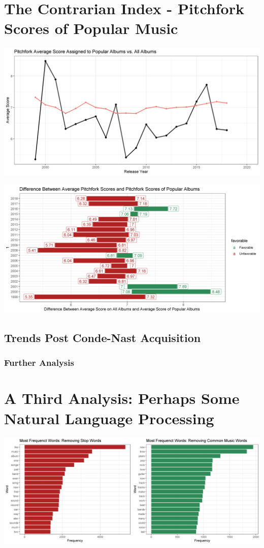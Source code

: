 \documentclass[a4paper,12pt]{article}
\begin{document}
\section{The Contrarian Index - Pitchfork Scores of Popular Music}
\includegraphics[width = \linewidth]{"figures/contrarian_index.png"}

\includegraphics[width = \linewidth]{"figures/contrarian_index_bar.png"}

\subsection{Trends Post Conde-Nast Acquisition}
\subsubsection{Further Analysis}

\section{A Third Analysis: Perhaps Some Natural Language Processing}
\includegraphics[width = \linewidth]{"figures/word_distribution_plot.png"}
\end{document}
